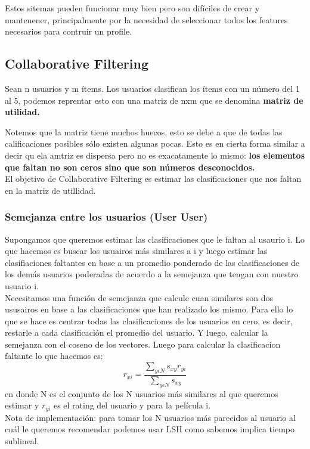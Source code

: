 \documentclass[titlepage,a4paper]{article}
\begin{document}
Estos sitemas pueden funcionar muy bien pero son difíciles de crear y mantenener, principalmente por la necesidad de seleccionar todos los features necesarios para contruir un profile.

\subsection*{Collaborative Filtering}
 Sean n usuarios y m ítems. Los usuarios clasifican los ítems con un número del 1 al 5, podemos reprentar esto con una matriz de nxm que se denomina \textbf{matriz de utilidad.}

Notemos que la matriz tiene muchos huecos, esto se debe a que de todas las calificaciones posibles sólo existen algunas pocas. Esto es en cierta forma similar a decir qu ela amtriz es dispersa pero no es exacatamente lo mismo: \textbf{los elementos que faltan no son ceros sino que son números desconocidos.}\\

El objetivo de Collaborative Filtering es estimar las clasificaciones que nos faltan en la matriz de utillidad. 

\subsubsection*{Semejanza entre los usuarios (User User)}
Supongamos que queremos estimar las clasificaciones que le faltan al usaurio i. Lo que hacemos es buscar los usuairos más similares a i y luego estimar las clasifiaciones faltantes en base a un promedio ponderado de las clasificaciones de los demás usuarios poderadas de acuerdo a la semejanza que tengan con nuestro usuario i.\\

Necesitamos una función de semejanza que calcule cuan similares son dos ususairos en base a las clasificaciones que han realizado los mismo. Para ello lo que se hace es centrar todas las clasificaciones de los usuarios en cero, es decir, restarle a cada clasificación el promedio del usuario. Y luego, calcular la semejanza con el coseno de los vectores. Luego para calcular la clasificacion faltante lo que hacemos es: $$ r_{xi} =\frac{ \sum_{y\epsilon N} s_{xy} r_{yi}}{\sum_{y\epsilon N} s_{xy} }$$en donde N es el conjunto de los N usuarios más similares al que queremos estimar y $r_{yi}$ es el rating del usuario y  para la película i. \\

Nota de implementación: para tomar los N usuarios más parecidos al usuario al cuál le queremos recomendar podemos usar LSH como sabemos implica tiempo sublineal. 
\end{document}
